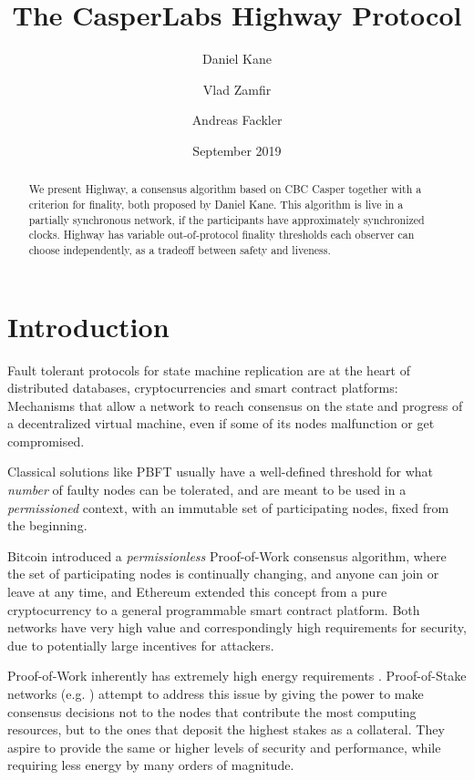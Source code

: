 \documentclass[12pt]{article}
\title{The CasperLabs Highway Protocol}
\author[1]{Daniel Kane}
\author[2]{Vlad Zamfir}
\author[3]{Andreas Fackler}
\affil[1]{Computer Science and Engineering Department, UC San Diego}
\affil[2]{Ethereum Research}
\affil[3]{CasperLabs LLC}
\date{September 2019}
\begin{document}
\maketitle
\tableofcontents
\pagebreak


\begin{abstract}
We present Highway, a consensus algorithm based on CBC Casper together with a criterion for finality, both proposed by Daniel Kane. This algorithm is live in a partially synchronous network, if the participants have approximately synchronized clocks. Highway has variable out-of-protocol finality thresholds each observer can choose independently, as a tradeoff between safety and liveness.
\end{abstract}


\section*{Introduction}

Fault tolerant protocols for state machine replication are at the heart of distributed databases, cryptocurrencies and smart contract platforms: Mechanisms that allow a network to reach consensus on the state and progress of a decentralized virtual machine, even if some of its nodes malfunction or get compromised.

Classical solutions like PBFT \cite{castro1999practical} usually have a well-defined threshold for what \emph{number} of faulty nodes can be tolerated, and are meant to be used in a \emph{permissioned} context, with an immutable set of participating nodes, fixed from the beginning.

Bitcoin \cite{nakamoto2008bitcoin} introduced a \emph{permissionless} Proof-of-Work consensus algorithm, where the set of participating nodes is continually changing, and anyone can join or leave at any time, and Ethereum \cite{wood2014ethereum} extended this concept from a pure cryptocurrency to a general programmable smart contract platform. Both networks have very high value and correspondingly high requirements for security, due to potentially large incentives for attackers.

Proof-of-Work inherently has extremely high energy requirements \cite{de2018bitcoin}. Proof-of-Stake networks (e.g. \cite{kiayias2017ouroboros}) attempt to address this issue by giving the power to make consensus decisions not to the nodes that contribute the most computing resources, but to the ones that deposit the highest stakes as a collateral. They aspire to provide the same or higher levels of security and performance, while requiring less energy by many orders of magnitude.
\end{document}
